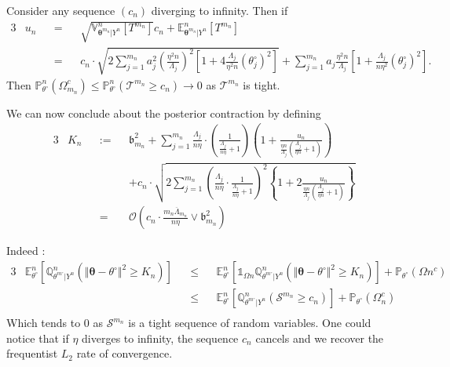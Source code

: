 {Consider any sequence $(c_{n})$ diverging to infinity.
Then if
\begin{alignat*}{3}
&u_{n} &&=&& \sqrt{\mathds{V}_{\boldsymbol{\theta}^{m_{n}} \vert Y^{n}}^{n}\left[T^{m_{n}}\right]} c_{n} + \mathds{E}_{\boldsymbol{\theta}^{m_{n}} \vert Y^{n}}^{n}\left[T^{m_{n}}\right]\\
& &&=&& c_{n} \cdot \sqrt{2 \sum\limits_{j = 1}^{m_{n}} a_{j}^{2} \left(\frac{\eta^{2} n}{\Lambda_{j}}\right)^{2} \left[1 + 4 \frac{\Lambda_{j}}{\eta^{2} n} \left(\theta^{\circ}_{j} \right)^{2}\right]} + \sum\limits_{j = 1}^{m_{n}} a_{j} \frac{\eta^{2} n}{\Lambda_{j}} \left[1 + \frac{\Lambda_{j}}{n \eta^{2}} \left(\theta^{\circ}_{j} \right)^{2}\right].
\end{alignat*}
Then $\mathds{P}_{\theta^{\circ}}^{n}(\Omega_{m_{n}}^{c}) \leq  \mathds{P}_{\theta^{\circ}}^{n}\left(\mathcal{T}^{m_{n}} \geq c_{n}\right) \rightarrow 0$ as $\mathcal{T}^{m_{n}}$ is tight.
}

\medskip

We can now conclude about the posterior contraction by defining
\begin{alignat*}{3}
&K_{n} &&:=&& \mathfrak{b}_{m_{n}}^{2} +  \sum\limits_{j = 1}^{m_{n}} \frac{\Lambda_{j}}{n \eta}\cdot \left(\frac{1}{\frac{\Lambda_{j}}{n \eta} + 1}\right)\left(1 + \frac{u_{n}}{\frac{\eta n}{\Lambda_{j}}\left(\frac{\Lambda_{j}}{\eta n} + 1\right)}\right)\\
& && && + c_{n} \cdot \sqrt{2 \sum\limits_{j = 1}^{m_{n}} \left(\frac{\Lambda_{j}}{n \eta}\cdot \frac{1}{\frac{\Lambda_{j}}{n \eta} + 1}\right)^{2}\left\{1 + 2 \frac{u_{n}}{\frac{\eta n}{\Lambda_{j}}\left(\frac{\Lambda_{j}}{\eta n} + 1\right)}\right\}}\\
& &&=&& \mathcal{O}\left(c_{n} \cdot \frac{m_{n} \overline{\Lambda}_{m_{n}}}{n \eta} \vee \mathfrak{b}_{m_{n}}^{2}\right)
\end{alignat*}


Indeed :
\begin{alignat*}{3}
&\mathds{E}_{\theta^{\circ}}^{n}\left[\mathds{Q}_{\theta^{m^{\circ}}\vert Y^{n}}^{n}\left(\Vert \boldsymbol{\theta} - \theta^{\circ} \Vert^{2} \geq K_{n}\right)\right] &&\leq &&\mathds{E}_{\theta^{\circ}}^{n}\left[\mathds{1}_{\Omega{n}}\mathds{Q}_{\theta^{m^{\circ}}\vert Y^{n}}^{n}\left(\Vert \boldsymbol{\theta} - \theta^{\circ} \Vert^{2} \geq K_{n}\right)\right] + \mathds{P}_{\theta^{\circ}}(\Omega{n}^{c})\\
& &&\leq &&\mathds{E}_{\theta^{\circ}}^{n}\left[\mathds{Q}_{\theta^{m^{\circ}}\vert Y^{n}}^{n}\left(\mathcal{S}^{m_{n}} \geq c_{n} \right)\right] + \mathds{P}_{\theta^{\circ}}(\Omega_{n}^{c})\\
\end{alignat*}
Which tends to $0$ as $\mathcal{S}^{m_{n}}$ is a tight sequence of random variables.
One could notice that if $\eta$ diverges to infinity, the sequence $c_{n}$ cancels and we recover the frequentist $L_{2}$ rate of convergence.

